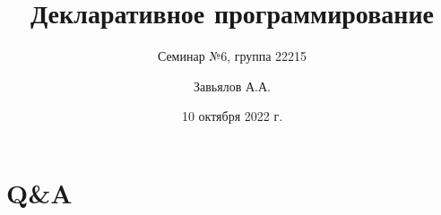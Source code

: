 \documentclass{beamer}
\title{Декларативное программирование}
\subtitle{Семинар №6, группа 22215}
\author{Завьялов А.А.}
\date{10 октября 2022 г.}
\institute{Кафедра систем информатики ФИТ НГУ}
\begin{document}
  \maketitle
  \section{Q\&A}
\end{document}
